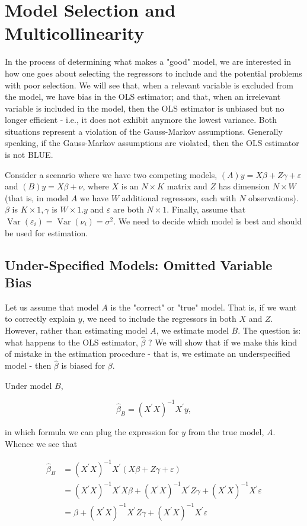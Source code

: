 \section{Model Selection and Multicollinearity}
In the process of determining what makes a "good" model, we are interested in how one goes about selecting the regressors to include and the potential problems with poor selection. We will see that, when a relevant variable is excluded from the model, we have bias in the OLS estimator; and that, when an irrelevant variable is included in the model, then the OLS estimator is unbiased but no longer efficient - i.e., it does not exhibit anymore the lowest variance. Both situations represent a violation of the Gauss-Markov assumptions. Generally speaking, if the Gauss-Markov assumptions are violated, then the OLS estimator is not BLUE.

Consider a scenario where we have two competing models, $(A) y=X \beta+Z \gamma+\varepsilon$ and $(B) y=X \beta+\nu$, where $X$ is an $N \times K$ matrix and $Z$ has dimension $N \times W$ (that is, in model $A$ we have $W$ additional regressors, each with $N$ observations). $\beta$ is $K \times 1, \gamma$ is $W \times 1 . y$ and $\varepsilon$ are both $N \times 1$. Finally, assume that $\operatorname{Var}\left(\varepsilon_{i}\right)=\operatorname{Var}\left(\nu_{i}\right)=\sigma^{2}$. We need to decide which model is best and should be used for estimation.

\subsection{Under-Specified Models: Omitted Variable Bias}
Let us assume that model $A$ is the "correct" or "true" model. That is, if we want to correctly explain $y$, we need to include the regressors in both $X$ and $Z$. However, rather than estimating model $A$, we estimate model $B$. The question is: what happens to the OLS estimator, $\widehat{\beta}$ ? We will show that if we make this kind of mistake in the estimation procedure - that is, we estimate an underspecified model - then $\widehat{\beta}$ is biased for $\beta$.

Under model $B$,

$$
\widehat{\beta}_{B}=\left(X^{\prime} X\right)^{-1} X^{\prime} y,
$$

in which formula we can plug the expression for $y$ from the true model, $A$. Whence we see that

$$
\begin{aligned}
\widehat{\beta}_{B} & =\left(X^{\prime} X\right)^{-1} X^{\prime}(X \beta+Z \gamma+\varepsilon) \\
& =\left(X^{\prime} X\right)^{-1} X^{\prime} X \beta+\left(X^{\prime} X\right)^{-1} X^{\prime} Z \gamma+\left(X^{\prime} X\right)^{-1} X^{\prime} \varepsilon \\
& =\beta+\left(X^{\prime} X\right)^{-1} X^{\prime} Z \gamma+\left(X^{\prime} X\right)^{-1} X^{\prime} \varepsilon
\end{aligned}
$$

